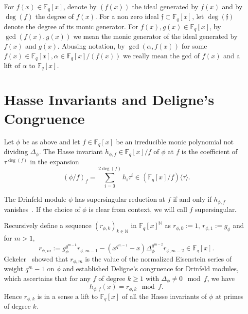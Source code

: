 \documentclass[12pt]{article}
\theoremstyle{plain}
\theoremstyle{definition}
\def\F{\ensuremath{\mathbb{F}}}
\newcommand{\D}{\Delta}
\newcommand{\ph}{(\phi/f)}
\newcommand{\f}{\mathfrak f}
\begin{document}
For $f(x) \in \F_q[x]$, denote by $(f(x))$ the ideal generated by
$f(x)$ and by $\deg(f)$ the degree of $f(x)$. For a non zero ideal $\f
\subset \F_q[x]$, let $\deg(\f)$ denote the degree of its monic
generator. For $f(x),g(x) \in \F_q[x]$, by $\gcd(f(x),g(x))$ we mean
the monic generator of the ideal generated by $f(x)$ and
$g(x)$. Abusing notation, by $\gcd(\alpha,f(x))$ for some $f(x) \in
\F_q[x], \alpha \in \F_q[x]/(f(x))$ we really mean the gcd of $f(x)$
and a lift of $\alpha$ to $\F_q[x]$.



\section{Hasse Invariants and Deligne's Congruence}

Let $\phi$ be as above and let $f \in \F_q[x]$ be an irreducible monic
polynomial not dividing $\Delta_\phi$. The Hasse invariant $h_{\phi,f}
\in \F_q[x]/f$ of $\phi$ at $f$ is the coefficient of $\tau^{\deg(f)}$
in the expansion $$\ph_f = \sum_{i=0}^{2\deg(f)} h_i \tau^i \in
(\F_{q}[x]/f)\langle \tau \rangle.$$

The Drinfeld module $\phi$ has supersingular reduction at $f$ if and
only if $h_{\phi,f}$ vanishes~\cite{gos}. If the choice of $\phi$ is
clear from context, we will call $f$ supersingular.

Recursively define a sequence $(r_{\phi,k})_{k \in \mathbb{N}}$
in $\F_q[x]^\mathbb{N}$ as $r_{\phi,0}:=1$, $r_{\phi,1}:=g_\phi$ and for $m>1$,
\begin{equation}\label{eisenstein_recurrence}
r_{\phi,m} := g_\phi^{q^{m-1}}r_{\phi,m-1} - (x^{q^{m-1}}-x)\D_\phi^{q^{m-2}} r_{\phi,m-2} \in \F_q[x].
\end{equation}
Gekeler~\cite[Eq 3.6, Prop 3.7]{gek} showed that $r_{\phi,m}$ is
the value of the normalized Eisenstein series of weight $q^{m}-1$ on
$\phi$ and established Deligne's congruence for Drinfeld modules,
which ascertains that for any $f$ of degree $k \geq 1$ with
$\Delta_\phi \neq 0 \mod f$, we have
\begin{equation}\label{deligne_congruence}
 h_{\phi,f}(x) = r_{\phi,k} \mod f.
\end{equation}
Hence $r_{\phi,k}$ is in a sense a lift to $\F_q[x]$ of all the Hasse invariants of $\phi$ at primes of degree $k$.
\end{document}
